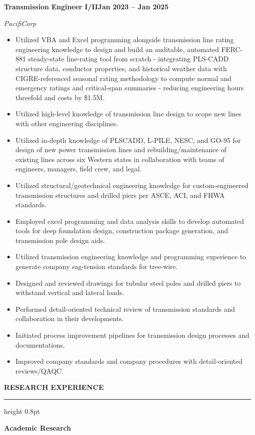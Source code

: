 \documentclass[10pt, letterpaper]{article}
\newcommand{\rsection}[1]{%
  \vspace{8pt}%
  {\large\bfseries\MakeUppercase{#1}}%
  \vspace{1pt}%
  \hrule height 0.8pt%
  \vspace{4pt}%
}
\newcommand{\jobline}[2]{%
  \vspace{5pt}%
  \noindent\textbf{#1}\hfill\textbf{#2}\par%
  \vspace{1pt}%
}
\newcommand{\subline}[1]{%
  \vspace{-1pt}%
  \noindent\textit{#1}\par%
  \vspace{1pt}%
}
\newenvironment{rlist}{%
  \begin{itemize}[leftmargin=1.4em, itemsep=1pt, topsep=2pt, parsep=0pt]%
}{%
  \end{itemize}%
}
\begin{document}
\jobline{Transmission Engineer I/II}{Jan 2023 -- Jan 2025}
\subline{PacifiCorp}
\begin{rlist}
  \item Utilized VBA and Excel programming alongside transmission line rating engineering knowledge to design and build an auditable, automated FERC-881 steady-state line-rating tool from scratch - integrating PLS-CADD structure data, conductor properties, and historical weather data with CIGRE-referenced seasonal rating methodology to compute normal and emergency ratings and critical-span summaries - reducing engineering hours threefold and costs by \$1.5M.
  \item Utilized high-level knowledge of transmission line design to scope new lines with other engineering disciplines.
  \item Utilized in-depth knowledge of PLSCADD, L-PILE, NESC, and GO-95 for design of new power transmission lines and rebuilding/maintenance of existing lines across six Western states in collaboration with teams of engineers, managers, field crew, and legal.
  \item Utilized structural/geotechnical engineering knowledge for custom-engineered transmission structures and drilled piers per ASCE, ACI, and FHWA standards.
  \item Employed excel programming and data analysis skills to develop automated tools for deep foundation design, construction package generation, and transmission pole design aids.
  \item Utilized transmission engineering knowledge and programming experience to generate company sag-tension standards for tree-wire.
  \item Designed and reviewed drawings for tubular steel poles and drilled piers to withstand vertical and lateral loads.
  \item Performed detail-oriented technical review of transmission standards and collaboration in their developments.
  \item Initiated process improvement pipelines for transmission design processes and documentations.
  \item Improved company standards and company procedures with detail-oriented reviews/QAQC.
\end{rlist}

\rsection{Research Experience}

\noindent\textbf{Academic Research}
\end{document}
